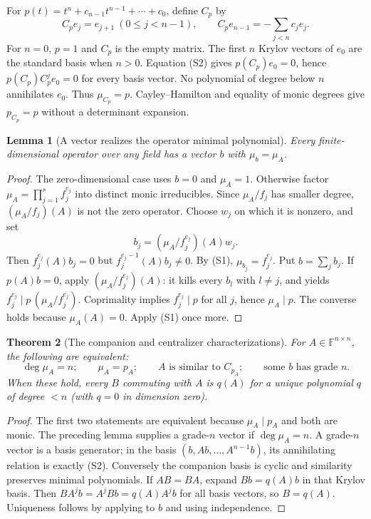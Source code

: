 \documentclass[11pt,a4paper]{article}
\newtheorem{theorem}{Theorem}[section]
\newtheorem{lemma}[theorem]{Lemma}
\theoremstyle{definition}
\newcommand{\F}{\mathbb F}
\begin{document}
For $p(t)=t^n+c_{n-1}t^{n-1}+\cdots+c_0$, define $C_p$ by
\[
 C_pe_j=e_{j+1}\ (0\le j<n-1),\qquad
 C_pe_{n-1}=-\sum_{j<n}c_je_j.
 \tag{S2}
\]
For $n=0$, $p=1$ and $C_p$ is the empty matrix.
The first $n$ Krylov vectors of $e_0$ are the standard basis when $n>0$.
Equation (S2) gives $p(C_p)e_0=0$, hence $p(C_p)C_p^je_0=0$ for every
basis vector. No polynomial of degree below $n$ annihilates $e_0$.
Thus $\mu_{C_p}=p$. Cayley--Hamilton and equality of monic degrees give
$p_{C_p}=p$ without a determinant expansion.

\begin{lemma}[A vector realizes the operator minimal polynomial]
Every finite-dimensional operator over any field has a vector $b$ with
$\mu_b=\mu_A$.
\end{lemma}
\begin{proof}
The zero-dimensional case uses $b=0$ and $\mu_A=1$. Otherwise factor
$\mu_A=\prod_{j=1}^s f_j^{e_j}$ into distinct monic irreducibles.
Since $\mu_A/f_j$ has smaller degree, $(\mu_A/f_j)(A)$ is not the zero
operator. Choose $w_j$ on which it is nonzero, and set
\[
 b_j=(\mu_A/f_j^{e_j})(A)w_j.
\]
Then $f_j^{e_j}(A)b_j=0$ but $f_j^{e_j-1}(A)b_j\ne0$.
By (S1), $\mu_{b_j}=f_j^{e_j}$. Put $b=\sum_jb_j$.
If $p(A)b=0$, apply $(\mu_A/f_j^{e_j})(A)$: it kills every $b_l$ with
$l\ne j$, and yields
$f_j^{e_j}\mid p\,(\mu_A/f_j^{e_j})$.
Coprimality implies $f_j^{e_j}\mid p$ for all $j$, hence $\mu_A\mid p$.
The converse holds because $\mu_A(A)=0$. Apply (S1) once more.
\end{proof}

\begin{theorem}[The companion and centralizer characterizations]
For $A\in\F^{n\times n}$, the following are equivalent:
\[
 \deg\mu_A=n;\qquad \mu_A=p_A;\qquad
 A\text{ is similar to }C_{p_A};\qquad
 \text{some }b\text{ has grade }n.
 \tag{S3}
\]
When these hold, every $B$ commuting with $A$ is $q(A)$ for a unique
polynomial $q$ of degree $<n$ (with $q=0$ in dimension zero).
\end{theorem}
\begin{proof}
The first two statements are equivalent because $\mu_A\mid p_A$ and
both are monic. The preceding lemma supplies a grade-$n$ vector if
$\deg\mu_A=n$. A grade-$n$ vector is a basis generator; in the basis
$(b,Ab,\ldots,A^{n-1}b)$, its annihilating relation is exactly (S2).
Conversely the companion basis is cyclic and similarity preserves
minimal polynomials. If $AB=BA$, expand $Bb=q(A)b$ in that Krylov basis.
Then $BA^jb=A^jBb=q(A)A^jb$ for all basis vectors, so $B=q(A)$.
Uniqueness follows by applying to $b$ and using independence.
\end{proof}
\end{document}
